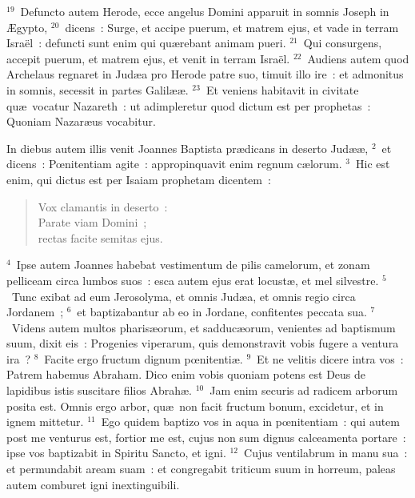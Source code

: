 ${}^{19}$~Defuncto autem Herode, ecce angelus Domini apparuit in somnis Joseph in \AE gypto,
${}^{20}$~dicens~: Surge, et accipe puerum, et matrem ejus, et vade in terram Isra\"el~: defuncti sunt enim qui qu\ae rebant animam pueri.
${}^{21}$~Qui consurgens, accepit puerum, et matrem ejus, et venit in terram Isra\"el.
${}^{22}$~Audiens autem quod Archelaus regnaret in Jud\ae a pro Herode patre suo, timuit illo ire~: et admonitus in somnis, secessit in partes Galil\ae \ae .
${}^{23}$~Et veniens habitavit in civitate qu\ae\ vocatur Nazareth~: ut adimpleretur quod dictum est per prophetas~: Quoniam Nazar\ae us vocabitur.

\lettrine[lines=10,image=true,loversize=0.05,lraise=-0.03]{I}{}n diebus autem illis venit Joannes Baptista pr\ae dicans in deserto Jud\ae \ae ,
${}^{2}$~et dicens~: Pœnitentiam agite~: appropinquavit enim regnum c\ae lorum.
${}^{3}$~Hic est enim, qui dictus est per Isaiam prophetam dicentem~: \begin{flushleft}\begin{verse}Vox clamantis in deserto~:\\ Parate viam Domini~;\\ rectas facite semitas ejus.\end{verse}\end{flushleft}


${}^{4}$~Ipse autem Joannes habebat vestimentum de pilis camelorum, et zonam pelliceam circa lumbos suos~: esca autem ejus erat locust\ae , et mel silvestre.
${}^{5}$~Tunc exibat ad eum Jerosolyma, et omnis Jud\ae a, et omnis regio circa Jordanem~;
${}^{6}$~et baptizabantur ab eo in Jordane, confitentes peccata sua.
${}^{7}$~Videns autem multos pharis\ae orum, et sadduc\ae orum, venientes ad baptismum suum, dixit eis~: Progenies viperarum, quis demonstravit vobis fugere a ventura ira~?
${}^{8}$~Facite ergo fructum dignum pœnitenti\ae .
${}^{9}$~Et ne velitis dicere intra vos~: Patrem habemus Abraham. Dico enim vobis quoniam potens est Deus de lapidibus istis suscitare filios Abrah\ae .
${}^{10}$~Jam enim securis ad radicem arborum posita est. Omnis ergo arbor, qu\ae\ non facit fructum bonum, excidetur, et in ignem mittetur.
${}^{11}$~Ego quidem baptizo vos in aqua in pœnitentiam~: qui autem post me venturus est, fortior me est, cujus non sum dignus calceamenta portare~: ipse vos baptizabit in Spiritu Sancto, et igni.
${}^{12}$~Cujus ventilabrum in manu sua~: et permundabit aream suam~: et congregabit triticum suum in horreum, paleas autem comburet igni inextinguibili.


